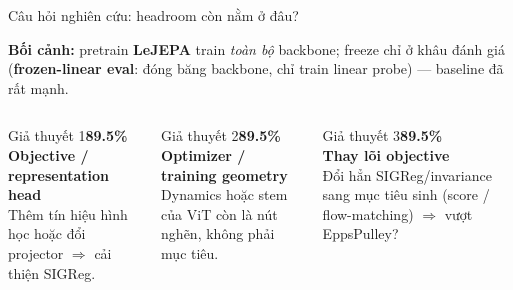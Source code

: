 \documentclass[aspectratio=169,9pt]{beamer}
\newcommand{\kw}[1]{\textbf{\color{mprimary}#1}}
\begin{document}
\begin{frame}{Câu hỏi nghiên cứu: headroom còn nằm ở đâu?}

\vfill
\begin{center}
{\footnotesize\color{mgray}\textbf{Bối cảnh:} pretrain \kw{LeJEPA} train \emph{toàn bộ} backbone; freeze chỉ ở khâu đánh giá (\kw{frozen-linear eval}: đóng băng backbone, chỉ train linear probe) — baseline đã rất mạnh.}
\end{center}

\vspace{0.7em}
\begin{columns}[T]
\begin{mdframed}[roundcorner=8pt, linewidth=1.2pt, linecolor=mprimary!55,
    backgroundcolor=mlight, innertopmargin=8pt, innerbottommargin=8pt,
    innerleftmargin=8pt, innerrightmargin=8pt]
{\footnotesize\color{mgray}Giả thuyết 1}\hfill{\footnotesize\color{mgray}\textbf{\color{mprimary}89.5\%}}\\[5pt]
{\bfseries\color{mprimary}Objective / representation head}\\[5pt]
{\footnotesize Thêm tín hiệu hình học hoặc đổi projector $\Rightarrow$ cải thiện SIGReg.}
\end{mdframed}

\begin{mdframed}[roundcorner=8pt, linewidth=1.2pt, linecolor=mgood!60,
    backgroundcolor=mlightsage, innertopmargin=8pt, innerbottommargin=8pt,
    innerleftmargin=8pt, innerrightmargin=8pt]
{\footnotesize\color{mgray}Giả thuyết 2}\hfill{\footnotesize\color{mgray}\textbf{\color{mgood!60!black}89.5\%}}\\[5pt]
{\bfseries\color{mgood!60!black}Optimizer / training geometry}\\[5pt]
{\footnotesize Dynamics hoặc stem của ViT còn là nút nghẽn, không phải mục tiêu.}
\end{mdframed}

\begin{mdframed}[roundcorner=8pt, linewidth=1.2pt, linecolor=maccent!65,
    backgroundcolor=mlightgold, innertopmargin=8pt, innerbottommargin=8pt,
    innerleftmargin=8pt, innerrightmargin=8pt]
{\footnotesize\color{mgray}Giả thuyết 3}\hfill{\footnotesize\color{mgray}\textbf{\color{maccent!70!black}89.5\%}}\\[5pt]
{\bfseries\color{maccent!70!black}Thay lõi objective}\\[5pt]
{\footnotesize Đổi hẳn SIGReg/invariance sang mục tiêu sinh (score / flow-matching) $\Rightarrow$ vượt EppsPulley?}
\end{mdframed}
\end{columns}


\end{frame}
\end{document}
